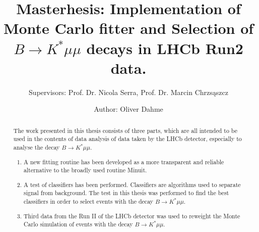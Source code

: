 \documentclass[english]{uzhpub}
\begin{document}
\title{Masterhesis:
Implementation of Monte Carlo fitter and Selection of $B \rightarrow K^* \mu \mu$ decays in LHCb Run2 data.}
\subtitle{Supervisors: Prof. Dr. Nicola Serra, Prof. Dr. Marcin Chrzs\k{a}szcz}

\author{Author: Oliver Dahme}


\maketitle




\begin{abstract}
  The work presented in this thesis consists of three parts, which are all intended to be used in the contents of data analysis of data taken by the LHCb detector, especially to analyse the decay $B \rightarrow K^* \mu \mu$.
  \begin{enumerate}
    \item A new fitting routine has been developed as a more transparent and reliable alternative to the broadly used routine Minuit.
    \item A test of classifiers has been performed. Classifiers are algorithms used to separate signal from background. The test in this thesis was performed to find the best classifiers in order to select events with the decay $B \rightarrow K^* \mu \mu$.
    \item Third data from the Run II of the LHCb detector was used to reweight the Monte Carlo simulation of events with the decay $B \rightarrow K^* \mu \mu$.
  \end{enumerate}
\end{abstract}

\clearpage

\tableofcontents



\clearpage
\end{document}
